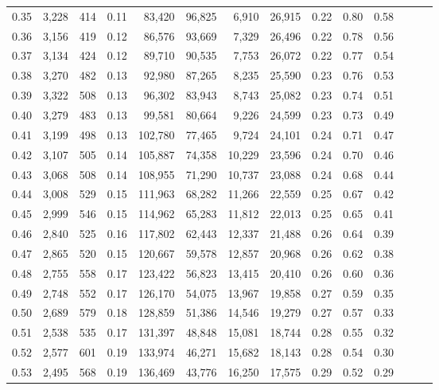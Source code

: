 \begin{tabular}{rrrrrrrrrrrrrr}
0.35 &  3,228 &  414 &  0.11 &   83,420 &   96,825 &   6,910 &  26,915 &  0.22 &  0.80 &      0.58 \\
0.36 &  3,156 &  419 &  0.12 &   86,576 &   93,669 &   7,329 &  26,496 &  0.22 &  0.78 &      0.56 \\
0.37 &  3,134 &  424 &  0.12 &   89,710 &   90,535 &   7,753 &  26,072 &  0.22 &  0.77 &      0.54 \\
0.38 &  3,270 &  482 &  0.13 &   92,980 &   87,265 &   8,235 &  25,590 &  0.23 &  0.76 &      0.53 \\
0.39 &  3,322 &  508 &  0.13 &   96,302 &   83,943 &   8,743 &  25,082 &  0.23 &  0.74 &      0.51 \\
0.40 &  3,279 &  483 &  0.13 &   99,581 &   80,664 &   9,226 &  24,599 &  0.23 &  0.73 &      0.49 \\
0.41 &  3,199 &  498 &  0.13 &  102,780 &   77,465 &   9,724 &  24,101 &  0.24 &  0.71 &      0.47 \\
0.42 &  3,107 &  505 &  0.14 &  105,887 &   74,358 &  10,229 &  23,596 &  0.24 &  0.70 &      0.46 \\
0.43 &  3,068 &  508 &  0.14 &  108,955 &   71,290 &  10,737 &  23,088 &  0.24 &  0.68 &      0.44 \\
0.44 &  3,008 &  529 &  0.15 &  111,963 &   68,282 &  11,266 &  22,559 &  0.25 &  0.67 &      0.42 \\
0.45 &  2,999 &  546 &  0.15 &  114,962 &   65,283 &  11,812 &  22,013 &  0.25 &  0.65 &      0.41 \\
0.46 &  2,840 &  525 &  0.16 &  117,802 &   62,443 &  12,337 &  21,488 &  0.26 &  0.64 &      0.39 \\
0.47 &  2,865 &  520 &  0.15 &  120,667 &   59,578 &  12,857 &  20,968 &  0.26 &  0.62 &      0.38 \\
0.48 &  2,755 &  558 &  0.17 &  123,422 &   56,823 &  13,415 &  20,410 &  0.26 &  0.60 &      0.36 \\
0.49 &  2,748 &  552 &  0.17 &  126,170 &   54,075 &  13,967 &  19,858 &  0.27 &  0.59 &      0.35 \\
0.50 &  2,689 &  579 &  0.18 &  128,859 &   51,386 &  14,546 &  19,279 &  0.27 &  0.57 &      0.33 \\
0.51 &  2,538 &  535 &  0.17 &  131,397 &   48,848 &  15,081 &  18,744 &  0.28 &  0.55 &      0.32 \\
0.52 &  2,577 &  601 &  0.19 &  133,974 &   46,271 &  15,682 &  18,143 &  0.28 &  0.54 &      0.30 \\
0.53 &  2,495 &  568 &  0.19 &  136,469 &   43,776 &  16,250 &  17,575 &  0.29 &  0.52 &      0.29 \\

\end{tabular}
